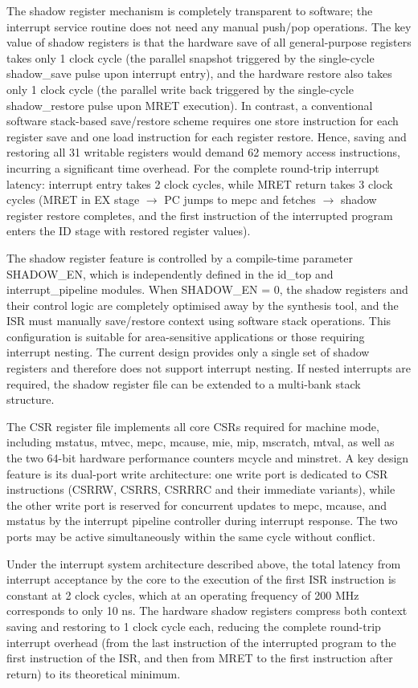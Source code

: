 \documentclass[letterpaper,journal]{IEEEtran}
\begin{document}
The shadow register mechanism is completely transparent to software; the interrupt service routine does not need any manual push/pop operations.
The key value of shadow registers is that the hardware save of all general-purpose registers takes only 1 clock cycle (the parallel snapshot triggered by the single-cycle shadow\_save pulse upon interrupt entry), and the hardware restore also takes only 1 clock cycle (the parallel write back triggered by the single-cycle shadow\_restore pulse upon MRET execution).
In contrast, a conventional software stack-based save/restore scheme requires one store instruction for each register save and one load instruction for each register restore.
Hence, saving and restoring all 31 writable registers would demand 62 memory access instructions, incurring a significant time overhead.
For the complete round-trip interrupt latency: interrupt entry takes 2 clock cycles, while MRET return takes 3 clock cycles (MRET in EX stage $\rightarrow$ PC jumps to mepc and fetches $\rightarrow$ shadow register restore completes, and the first instruction of the interrupted program enters the ID stage with restored register values).

The shadow register feature is controlled by a compile-time parameter SHADOW\_EN, which is independently defined in the id\_top and interrupt\_pipeline modules.
When SHADOW\_EN = 0, the shadow registers and their control logic are completely optimised away by the synthesis tool, and the ISR must manually save/restore context using software stack operations.
This configuration is suitable for area-sensitive applications or those requiring interrupt nesting.
The current design provides only a single set of shadow registers and therefore does not support interrupt nesting.
If nested interrupts are required, the shadow register file can be extended to a multi-bank stack structure.

The CSR register file implements all core CSRs required for machine mode, including mstatus, mtvec, mepc, mcause, mie, mip, mscratch, mtval, as well as the two 64-bit hardware performance counters mcycle and minstret.
A key design feature is its dual-port write architecture: one write port is dedicated to CSR instructions (CSRRW, CSRRS, CSRRRC and their immediate variants), while the other write port is reserved for concurrent updates to mepc, mcause, and mstatus by the interrupt pipeline controller during interrupt response.
The two ports may be active simultaneously within the same cycle without conflict.

Under the interrupt system architecture described above, the total latency from interrupt acceptance by the core to the execution of the first ISR instruction is constant at 2 clock cycles, which at an operating frequency of 200 MHz corresponds to only 10 ns.
The hardware shadow registers compress both context saving and restoring to 1 clock cycle each, reducing the complete round-trip interrupt overhead (from the last instruction of the interrupted program to the first instruction of the ISR, and then from MRET to the first instruction after return) to its theoretical minimum.
\end{document}

